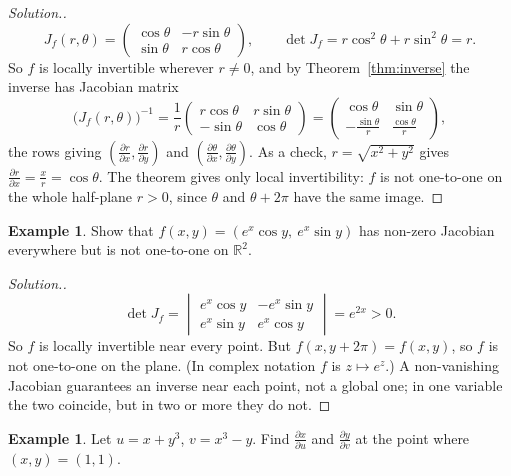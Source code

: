 \documentclass[11pt,a4paper]{article}
\theoremstyle{definition}
\newtheorem{exa}[thm]{Example}
\newenvironment{solution}
  {\renewcommand{\qedsymbol}{}\begin{proof}[\textit{Solution}.]}
  {\end{proof}}
\begin{document}
\begin{solution}
\[J_f(r,\theta) = \begin{pmatrix}
\cos \theta & - r\sin \theta\\
\sin \theta & r\cos \theta
\end{pmatrix},\qquad \det J_f = r\cos^2\theta + r\sin^2\theta = r .\]
So $f$ is locally invertible wherever $r\neq 0$, and by
Theorem~\ref{thm:inverse} the inverse has Jacobian matrix
\[\big(J_f(r,\theta)\big)^{-1} = \frac{1}{r}\begin{pmatrix}
r\cos \theta & r \sin \theta \\
-\sin \theta & \cos \theta
\end{pmatrix} =
\begin{pmatrix}
\cos \theta & \sin \theta\\
-\frac{\sin \theta}{r} & \frac{\cos \theta}{r}
\end{pmatrix} ,\]
the rows giving $\left(\frac{\partial r}{\partial x}, \frac{\partial r}{\partial
y}\right)$ and $\left(\frac{\partial \theta}{\partial x}, \frac{\partial
\theta}{\partial y}\right)$. As a check, $r = \sqrt{x^2+y^2}$ gives
$\frac{\partial r}{\partial x} = \frac{x}{r} = \cos\theta$. The theorem gives
only local invertibility: $f$ is not one-to-one on the whole half-plane $r>0$,
since $\theta$ and $\theta + 2\pi$ have the same image.
\end{solution}

\begin{exa}
\label{ex:inverselocal}
Show that $f(x,y) = (e^x\cos y,\ e^x\sin y)$ has non-zero Jacobian everywhere but
is not one-to-one on $\mathbb{R}^2$.
\end{exa}

\begin{solution}
\[\det J_f = \begin{vmatrix} e^x\cos y & -e^x\sin y\\ e^x\sin y & e^x\cos
y\end{vmatrix} = e^{2x}>0 .\]
So $f$ is locally invertible near every point. But $f(x, y + 2\pi) = f(x,y)$, so
$f$ is not one-to-one on the plane. (In complex notation $f$ is
$z\mapsto e^z$.) A non-vanishing Jacobian guarantees an inverse near each point,
not a global one; in one variable the two coincide, but in two or more they do
not.
\end{solution}

\begin{exa}
\label{ex:inversederiv}
Let $u = x + y^3$, $v = x^3 - y$. Find $\frac{\partial x}{\partial u}$ and
$\frac{\partial y}{\partial v}$ at the point where $(x,y) = (1,1)$.
\end{exa}
\end{document}
